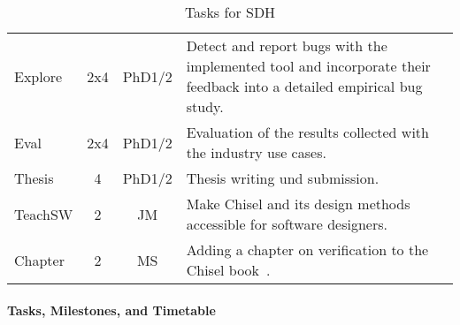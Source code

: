 \documentclass[fleqn,12pt]{article}
\begin{document}
\begin{table*}
{\begin{center}
\begin{tabular}{lccp{110mm}l}
      \midrule
      Explore                & 2x4 & PhD1/2    & Detect and report bugs with the implemented tool and incorporate their feedback into a detailed
      empirical bug study.                                                                                                                      \\
      Eval                   & 2x4 & PhD1/2    & Evaluation of the results collected with the industry use cases.                                                     \\
      Thesis                 & 4   & PhD1/2    & Thesis writing und submission.                                                                \\
      \midrule
      TeachSW                 &  2  & JM            & Make Chisel and its design methods accessible for software designers. \\
      Chapter                & 2   & MS        & Adding a chapter on verification to the Chisel book~\cite{chisel:book}.                       \\
      \bottomrule
    \end{tabular}
  \end{center}
  \caption{Tasks for SDH}\label{tab:packages}
}
\end{table*}





\paragraph*{Tasks, Milestones, and Timetable}
\end{document}
